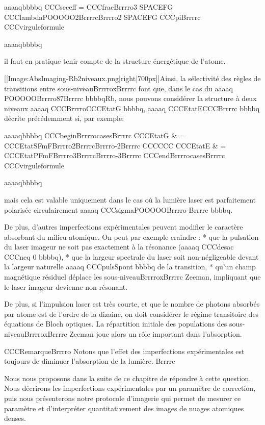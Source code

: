 aaaaqbbbbq
	CCCseceff = CCCfracBrrrro3 SPACEFG CCClambdaPOOOOO2BrrrrcBrrrro2 SPACEFG CCCpiBrrrrc
CCCvirguleformule
	
aaaaqbbbbq


 
il faut en pratique tenir compte de la structure énergétique de l'atome.


[[Image:AbsImaging-Rb2niveaux.png|right|700px]]Ainsi, la sélectivité des règles de transitions entre sous-niveauBrrrroxBrrrrc font que, dans le cas du aaaaq POOOOOBrrrro87Brrrrc bbbbqRb, nous pouvons considérer la structure à deux niveaux aaaaq CCCBrrrroCCCEtatG bbbbq, aaaaq CCCEtatECCCBrrrrc bbbbq décrite précédemment si, par exemple:



aaaaqbbbbq
CCCbeginBrrrrocasesBrrrrc
	CCCEtatG & = CCCEtatSFmFBrrrro2BrrrrcBrrrro-2Brrrrc CCCCCC
	CCCEtatE & = CCCEtatPFmFBrrrro3BrrrrcBrrrro-3Brrrrc 
CCCendBrrrrocasesBrrrrc
	CCCvirguleformule
	
aaaaqbbbbq



mais cela est valable uniquement dans le cas où la lumière laser est parfaitement polarisée circulairement aaaaq CCCsigmaPOOOOOBrrrro-Brrrrc bbbbq. 


De plus, d'autres imperfections expérimentales peuvent modifier le caractère absorbant du milieu atomique. On peut par exemple craindre : 
	* que la pulsation du laser imageur ne soit pas exactement à la résonance (aaaaq CCCdesac CCCneq 0 bbbbq),
	* que la largeur spectrale du laser soit non-négligeable devant la largeur naturelle aaaaq CCCpulsSpont bbbbq de la transition,
	* qu'un champ magnétique résiduel déplace les sous-niveauBrrrroxBrrrrc Zeeman, impliquant que le laser imageur devienne non-résonant.

	De plus, si l'impulsion laser est très courte, et que le nombre de photons absorbés par atome est de l'ordre de la dizaine, on doit considérer le régime transitoire des équations de Bloch optiques. La répartition initiale des populations des sous-niveauBrrrroxBrrrrc Zeeman joue alors un rôle important dans l'absorption.

CCCRemarqueBrrrro
Notons que l'effet des imperfections expérimentales est toujours de diminuer l'absorption de la lumière.
Brrrrc



Nous nous proposons dans la suite de ce chapitre de répondre à cette question. Nous décrirons les imperfections expérimentales par un paramètre de correction, puis nous présenterons notre protocole d'imagerie qui permet de mesurer ce paramètre et d'interpréter quantitativement des images de nuages atomiques denses.


